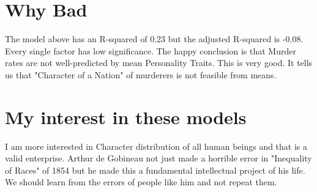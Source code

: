 \documentclass{amsart}
\begin{document}
\section{Why Bad}
The model above has an R-squared of 0.23 but the adjusted R-squared is -0.08.  Every single factor has low significance.  The happy conclusion is that Murder rates are not well-predicted by mean Personality Traits.  This is very good.  It tells us that "Character of a Nation" of murderers is not feasible from means.  

\section{My interest in these models}

I am more interested in Character distribution of all human beings and that is a valid enterprise.  Arthur de Gobineau not just made a horrible error in "Inequality of Races" of 1854 but he made this a fundamental intellectual project of his life.  We should learn from the errors of people like him and not repeat them.


\begin{thebibliography}{CCCC}
\end{thebibliography}
\end{document}
